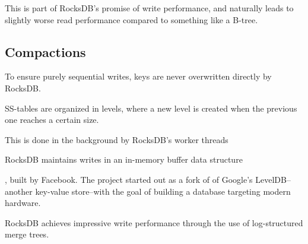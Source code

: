 \documentclass[b5paper]{report}
\begin{document}
This is part of RocksDB's
promise of write performance, and naturally leads to slightly worse read
performance compared to something like a B-tree.



\subsection{Compactions}
To ensure purely sequential writes, keys are never overwritten directly by
RocksDB.

SS-tables are organized in levels, where a new level is created when the
previous one reaches a certain size.

This is done in the background by RocksDB's
worker threads




RocksDB maintains writes in an in-memory buffer data structure

, built
by Facebook. The project started out as a fork of of Google's LevelDB--another
key-value store--with the goal of building a database targeting modern hardware.

RocksDB achieves impressive write performance through the use of log-structured
merge trees.




\end{document}

